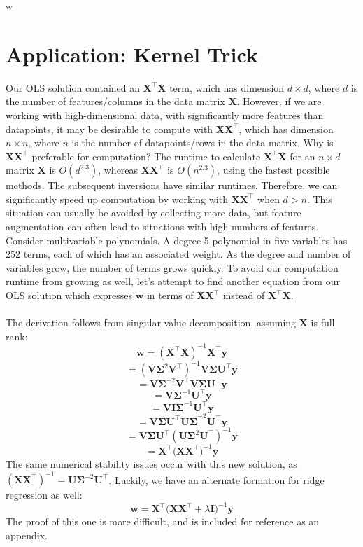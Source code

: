 w\documentclass{article}
\begin{document}
\section*{Application: Kernel Trick}
Our OLS solution contained an $\mathbf{X^{\top}X}$ term, which has dimension $d \times d$, where $d$ is the number of features/columns in the data matrix $\mathbf{X}$. However, if we are working with high-dimensional data, with significantly more features than datapoints, it may be desirable to compute with $\mathbf{XX^{\top}}$, which has dimension $n \times n$, where $n$ is the number of datapoints/rows in the data matrix. Why is $\mathbf{XX^{\top}}$ preferable for computation? The runtime to calculate $\mathbf{X^{\top}X}$ for an $n \times d$ matrix $\mathbf{X}$ is $O(d^{2.3})$, whereas $\mathbf{XX^{\top}}$ is $O(n^{2.3})$, using the fastest possible methods. The subsequent inversions have similar runtimes. Therefore, we can significantly speed up computation by working with $\mathbf{XX^{\top}}$ when $d > n$. This situation can usually be avoided by collecting more data, but feature augmentation can often lead to situations with high numbers of features. Consider multivariable polynomials. A degree-5 polynomial in five variables has 252 terms, each of which has an associated weight. As the degree and number of variables grow, the number of terms grows quickly. To avoid our computation runtime from growing as well, let's attempt to find another equation from our OLS solution which expresses $\mathbf{w}$ in terms of $\mathbf{XX^{\top}}$ instead of $\mathbf{X^{\top}X}$.\\\\
The derivation follows from singular value decomposition, assuming $\mathbf{X}$ is full rank: $$\mathbf{w} = (\mathbf{X^{\top}X})^{-1}\mathbf{X^{\top}y}$$ $$=(\mathbf{V\Sigma}^2\mathbf{ V^{\top}})^{-1}\mathbf{V\Sigma U^{\top}y}$$ $$=\mathbf{V\Sigma}^{-2}\mathbf{V^{\top}V\Sigma U^{\top}y}$$ $$=\mathbf{V\Sigma}^{-1}\mathbf{U^{\top}y}$$ $$=\mathbf{VI\Sigma}^{-1}\mathbf{U^{\top}y}$$ $$= \mathbf{V\Sigma U^{\top}U\Sigma}^{-2}\mathbf{U^{\top}y}$$ $$=\mathbf{V\Sigma U^{\top}}(\mathbf{U\Sigma}^2\mathbf{U^{\top}})^{-1}\mathbf{y}$$ $$= \mathbf{X^{\top}(XX^{\top}})^{-1}\mathbf{y}$$
The same numerical stability issues occur with this new solution, as $(\mathbf{XX^{\top}})^{-1} = \mathbf{U\Sigma}^{-2}\mathbf{U^{\top}}$. Luckily, we have an alternate formation for ridge regression as well: $$\mathbf{w} = \mathbf{X^{\top}(XX^{\top}} + \lambda\mathbf{I})^{-1}\mathbf{y}$$ The proof of this one is more difficult, and is included for reference as an appendix.\\\\
\end{document}
